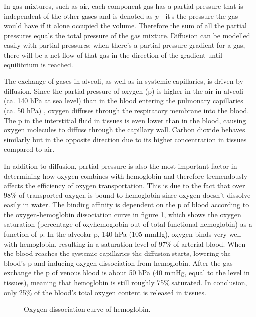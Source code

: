 In gas mixtures, such as air, each component gas has a partial pressure that is independent of the other gases and is denoted as \textit{p} - it's the pressure the gas would have if it alone occupied the volume. Therefore the sum of all the partial pressures equals the total pressure of the gas mixture. Diffusion can be modelled easily with partial pressures: when there's a partial pressure gradient for a gas, there will be a net flow of that gas in the direction of the gradient until equilibrium is reached.%

The exchange of gases in alveoli, as well as in systemic capillaries, is driven by diffusion. Since the partial pressure of oxygen (p) is higher in the air in alveoli (ca. 140 hPa at sea level) than in the blood entering the pulmonary capillaries (ca. 50 hPa) \cite{Thomas2004}, oxygen diffuses through the respiratory membrane into the blood. The p in the interstitial fluid in tissues is even lower than in the blood, causing oxygen molecules to diffuse through the capillary wall. Carbon dioxide behaves similarly but in the opposite direction due to its higher concentration in tissues compared to air.

In addition to diffusion, partial pressure is also the most important factor in determining how oxygen combines with hemoglobin and therefore tremendously affects the efficiency of oxygen transportation. This is due to the fact that over 98\% of transported oxygen is bound to hemoglobin since oxygen doesn't dissolve easily in water. The binding affinity is dependent on the p of blood according to the oxygen-hemoglobin dissociation curve in figure \ref{fig:oxygen_dissociation}, which shows the oxygen saturation (percentage of oxyhemoglobin out of total functional hemoglobin) as a function of p. In the alveolar p, 140 hPa (105 mmHg), oxygen binds very well with hemoglobin, resulting in a saturation level of 97\% of arterial blood. When the blood reaches the systemic capillaries the diffusion starts, lowering the blood's p and inducing oxygen dissociation from hemoglobin. After the gas exchange the p of venous blood is about 50 hPa (40 mmHg, equal to the level in tissues), meaning that hemoglobin is still roughly 75\% saturated. In conclusion, only 25\% of the blood's total oxygen content is released in tissues. \cite{Tortora2000}

\begin{figure}[htcb]
\caption{Oxygen dissociation curve of hemoglobin. \cite{molecularstation.com}}
\label{fig:oxygen_dissociation}
\end{figure}

